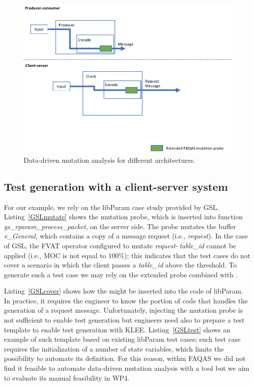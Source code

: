 \begin{figure}[h]
  \centering
    \includegraphics[width=14cm]{images/dataDrivenTestSuiteAugmentationB}
      \caption{Data-driven mutation analysis for different architectures.}
      \label{fig:dataDrivenTestSuiteAugmentationB}
\end{figure}

\ENDCHANGEDWPT



\clearpage
\subsection{Test generation with a client-server system}

\STARTCHANGEDWPT

For our example, we rely on the libParam case study provided by GSL. Listing~\ref{GSLmutate} shows the mutation probe, which is inserted into function \emph{gs\_rparam\_process\_packet}, on the server side. The probe mutates the buffer \emph{v\_General}, which contains a copy of a message request (i.e., \emph{request}). In the case of GSL, the FVAT operator configured to mutate \emph{request-$\>$table\_id} cannot be applied (i.e., MOC is not equal to 100\%); this indicates that the test cases do not cover a scenario in which the client passes a \emph{table\_id} above the threshold. To generate such a test case we may rely on the extended probe combined with . 

Listing~\ref{GSLcover} shows how the  might be inserted into the code of libParam. In practice, it requires the engineer to know the portion of code that handles the generation of a request message. Unfortunately, injecting the mutation probe is not sufficient to enable test generation but engineers need also to prepare a test template to enable test generation with KLEE. Listing~\ref{GSLtest} shows an example of such template based on existing libParam test cases; such test case requires the initialization of a number of state variables, which limits the possibility to automate its definition. For this reason, within FAQAS we did not find it feasible to automate data-driven mutation analysis with a tool but we aim to evaluate its manual feasibility in WP4.

